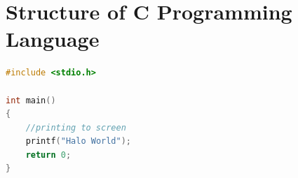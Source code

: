 %			
%			
%			
\section{Structure of C Programming Language}

\begin{lstlisting}[language=c,caption=Simple program example for C programming language,label=lst:helloworld,captionpos=t]
#include <stdio.h>

int main()
{
	//printing to screen
	printf("Halo World");
	return 0;
}
\end{lstlisting}

